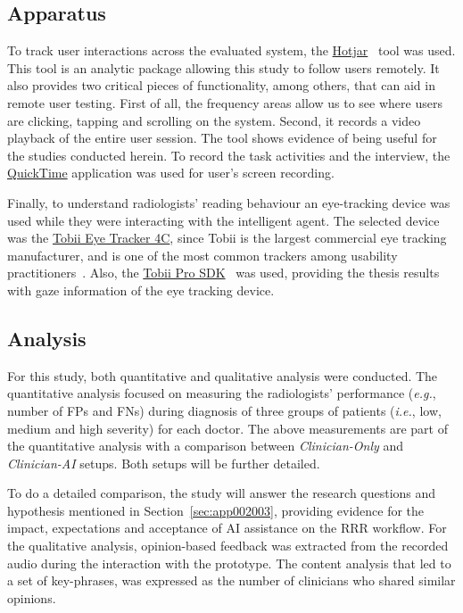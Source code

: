 \subsection{Apparatus}
\label{sec:app002005002}

To track user interactions across the evaluated system, the \hyperlink{https://www.hotjar.com/}{Hotjar}~\cite{liikkanen2017data} tool was used.
This tool is an analytic package allowing this study to follow users remotely.
It also provides two critical pieces of functionality, among others, that can aid in remote user testing.
First of all, the frequency areas allow us to see where users are clicking, tapping and scrolling on the system.
Second, it records a video playback of the entire user session.
The tool shows evidence of being useful for the studies conducted herein.
To record the task activities and the interview, the \hyperlink{https://support.apple.com/downloads/quicktime}{QuickTime} application was used for user's screen recording.

Finally, to understand radiologists' reading behaviour an eye-tracking device was used while they were interacting with the intelligent agent.
The selected device was the \hyperlink{https://gaming.tobii.com/product/tobii-eye-tracker-4c/}{Tobii Eye Tracker 4C}, since Tobii is the largest commercial eye tracking manufacturer, and is one of the most common trackers among usability practitioners~\cite{sidenko2018eye}.
Also, the \hyperlink{https://www.tobiipro.com/product-listing/tobii-pro-sdk/}{Tobii Pro SDK}~\cite{chatelain2018evaluation} was used, providing the thesis results with gaze information of the eye tracking device.

\subsection{Analysis}
\label{sec:app002005003}

For this study, both quantitative and qualitative analysis were conducted.
The quantitative analysis focused on measuring the radiologists' performance ({\it e.g.}, number of \acp{FP} and \acp{FN}) during diagnosis of three groups of patients ({\it i.e.}, low, medium and high severity) for each doctor.
The above measurements are part of the quantitative analysis with a comparison between {\it Clinician-Only} and {\it Clinician-AI} setups.
Both setups will be further detailed.

To do a detailed comparison, the study will answer the research questions and hypothesis mentioned in Section~\ref{sec:app002003}, providing evidence for the impact, expectations and acceptance of \ac{AI} assistance on the \ac{RRR} workflow.
For the qualitative analysis, opinion-based feedback was extracted from the recorded audio during the interaction with the prototype.
The content analysis that led to a set of key-phrases, was expressed as the number of clinicians who shared similar opinions.

